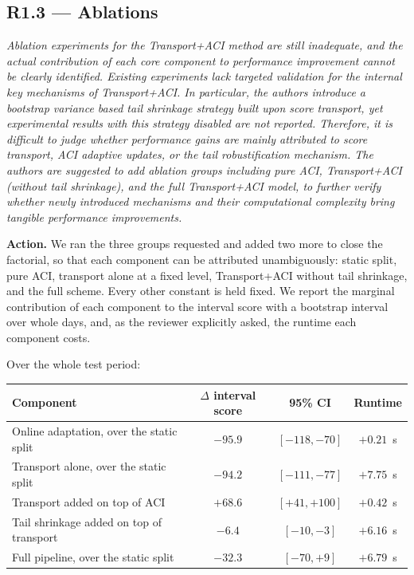 \documentclass[11pt,a4paper]{article}
\newenvironment{revcomment}
  {\begin{mdframed}[backgroundcolor=quotebg,linecolor=quoterule,linewidth=0.4pt,
    innertopmargin=6pt,innerbottommargin=6pt,skipabove=8pt,skipbelow=8pt]\itshape}
  {\end{mdframed}}
\newcommand{\action}[1]{\textbf{Action.} #1}
\begin{document}
\subsection*{R1.3 --- Ablations}

\begin{revcomment}
Ablation experiments for the Transport+ACI method are still inadequate, and the actual contribution of each core component to performance improvement cannot be clearly identified. Existing experiments lack targeted validation for the internal key mechanisms of Transport+ACI. In particular, the authors introduce a bootstrap variance based tail shrinkage strategy built upon score transport, yet experimental results with this strategy disabled are not reported. Therefore, it is difficult to judge whether performance gains are mainly attributed to score transport, ACI adaptive updates, or the tail robustification mechanism. The authors are suggested to add ablation groups including pure ACI, Transport+ACI (without tail shrinkage), and the full Transport+ACI model, to further verify whether newly introduced mechanisms and their computational complexity bring tangible performance improvements.
\end{revcomment}

\action{We ran the three groups requested and added two more to close the factorial, so that each component can be attributed unambiguously: static split, pure ACI, transport alone at a fixed level, Transport+ACI without tail shrinkage, and the full scheme. Every other constant is held fixed. We report the marginal contribution of each component to the interval score with a bootstrap interval over whole days, and, as the reviewer explicitly asked, the runtime each component costs.}

Over the whole test period:

\begin{center}
\begin{tabular}{@{}lccc@{}}
\toprule
Component & $\Delta$ interval score & 95\% CI & Runtime \\
\midrule
Online adaptation, over the static split & $-95.9$ & $[-118,-70]$ & $+0.21$~s \\
Transport alone, over the static split & $-94.2$ & $[-111,-77]$ & $+7.75$~s \\
Transport added on top of ACI & $\mathbf{+68.6}$ & $[+41,+100]$ & $+0.42$~s \\
Tail shrinkage added on top of transport & $-6.4$ & $[-10,-3]$ & $+6.16$~s \\
Full pipeline, over the static split & $-32.3$ & $[-70,+9]$ & $+6.79$~s \\
\bottomrule
\end{tabular}
\end{center}
\end{document}
